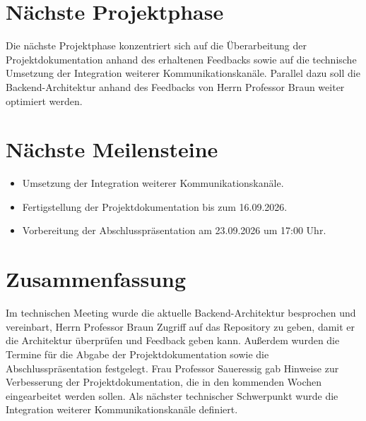 \documentclass[a4paper,11pt]{article}
\begin{document}
\vspace{0.5cm}

\section{Nächste Projektphase}

Die nächste Projektphase konzentriert sich auf die Überarbeitung der Projektdokumentation anhand des erhaltenen Feedbacks sowie auf die technische Umsetzung der Integration weiterer Kommunikationskanäle. Parallel dazu soll die Backend-Architektur anhand des Feedbacks von Herrn Professor Braun weiter optimiert werden.
\vspace{0.5cm}

\section{Nächste Meilensteine}

\begin{itemize}[leftmargin=1.2cm]

\item Umsetzung der Integration weiterer Kommunikationskanäle.

\item Fertigstellung der Projektdokumentation bis zum 16.09.2026.

\item Vorbereitung der Abschlusspräsentation am 23.09.2026 um 17:00 Uhr.

\end{itemize}

\vspace{1cm}

\section{Zusammenfassung}

Im technischen Meeting wurde die aktuelle Backend-Architektur besprochen und vereinbart, Herrn Professor Braun Zugriff auf das Repository zu geben, damit er die Architektur überprüfen und Feedback geben kann. Außerdem wurden die Termine für die Abgabe der Projektdokumentation sowie die Abschlusspräsentation festgelegt. Frau Professor Saueressig gab Hinweise zur Verbesserung der Projektdokumentation, die in den kommenden Wochen eingearbeitet werden sollen. Als nächster technischer Schwerpunkt wurde die Integration weiterer Kommunikationskanäle definiert.
\end{document}
